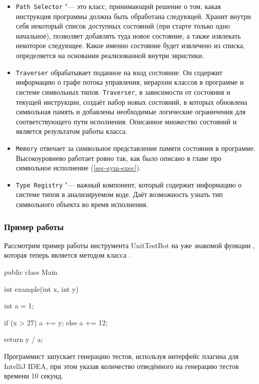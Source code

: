 \begin{itemize}
    \item \verb|Path Selector| "--- это класс, принимающий решение о том, какая инструкция программы должна быть обработана следующей. Хранит внутри себя некоторый список доступных состояний (при старте только одно начальное), позволяет добавлять туда новое состояние, а также извлекать некоторое следующее. Какое именно состояние будет извлечено из списка, определяется на основании реализованной внутри эвристики.
    \item \verb|Traverser| обрабатывает поданное на вход состояние. Он содержит информацию о графе потока управления, иерархии классов в программе и системе символьных типов. \verb|Traverser|, в зависимости от состояния и текущей инструкции, создаёт набор новых состояний, в которых обновлена символьная память и добавлены необходимые логические ограничения для соответствующего пути исполнения. Описанное множество состояний и является результатом работы класса.
    \item \verb|Memory| отвечает за символьное представление памяти состояния в программе. Высокоуровнево работает ровно так, как было описано в главе про символьное исполнение (\ref{sec-sym-exec}).
    \item \verb|Type Registry| "--- важный компонент, который содержит информацию о системе типов в анализируемом коде. Даёт возможность узнать тип символьного объекта во время исполнения.
\end{itemize}

\subsubsection{Пример работы}

Рассмотрим пример работы инструмента UnitTestBot на уже знакомой функции , которая теперь является методом класса .

\begin{code}
public class Main {

    int example(int x, int y) {
        int a = 1;

        if (x > 27) {
            a += y;
        } else {
            a += 12;
        }

        return y / a;
    }
}
\end{code}

Программист запускает генерацию тестов, используя интерфейс плагина для IntelliJ IDEA, при этом указав количество отведённого на генерацию тестов времени 10 секунд.

